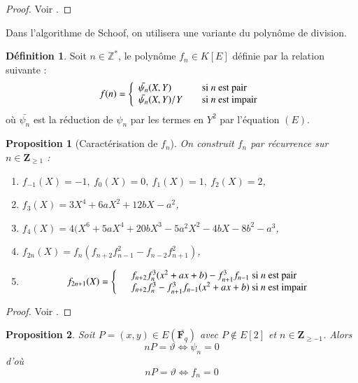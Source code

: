 \documentclass{article}%
\theoremstyle{plain}
\theoremstyle{definition}
\newtheorem{definition}{Définition}[section]
\theoremstyle{plain}
\newtheorem{proposition}{Proposition}[section]
\theoremstyle{plain}
\theoremstyle{remark}
\newcommand\fq{\mathbf{F}_{q}}
\begin{document}
\begin{proof}
Voir \cite{ref4}.
\end{proof}

Dans l'algorithme de Schoof, on utilisera une variante du polynôme de division.

\begin{definition}
Soit $n\in\mathbb{Z}^{*}$, le polynôme $f_{n}\in K[E]$ définie par la relation suivante : 
$$
f(n) = \left\{
\begin{array}{l l}
  \bar{\psi_{n}}(X,Y) & \quad \text{si } n \text{ est pair}\\
  \bar{\psi_{n}}(X,Y)/Y & \quad \text{si } n \text{ est impair}\\ \end{array} \right.
$$
où $\bar{\psi_{n}}$ est la réduction de $\psi_{n}$ par les termes en $Y^{2}$ par l'équation $(E)$.
\end{definition}

\begin{proposition}[Caractérisation de $f_{n}$]
On construit $f_{n}$ par récurrence sur $n\in\mathbf{Z}_{\geq 1}$ :
\begin{enumerate}
\item $f_{-1}(X)=-1,\ f_{0}(X)=0,\ f_{1}(X)=1,\ f_{2}(X)=2$,
\item $f_{3}(X)=3X^{4} + 6aX^{2} + 12bX - a^{2}$,
\item $f_{4}(X)=4(X^{6} + 5aX^{4} + 20bX^{3} - 5a^{2}X^{2} - 4bX - 8b^{2} - a^{3}$,
\item $f_{2n}(X)=f_{n}(f_{n+2}f_{n-1}^{2} - f_{n-2}f_{n+1}^{2})$,
\item $$
f_{2n+1}(X) = \left\{ 
\begin{array}{cl cl}
 &f_{n+2}f_{n}^{3}(x^{2} + ax + b) - f_{n+1}^{3}f_{n-1} \text{ si  } n \text{ est pair}\\
  &f_{n+2}f_{n}^{3} - f_{n+1}^{3}f_{n-1}(x^{2} + ax + b)\text{ si } n \text{ est impair}\\ \end{array} \right.
$$
\end{enumerate}
\end{proposition}

\begin{proof}
Voir \cite{ref4}.
\end{proof}

\begin{proposition}
Soit $P=(x,y)\in E(\bar{\fq})$ avec $P\notin E[2]$ et $n\in\mathbf{Z}_{\geq -1}$. Alors 
\begin{equation}
nP = \vartheta \Longleftrightarrow \psi_{n} = 0
\label{np}
\end{equation}
d'où
\begin{equation}
nP = \vartheta \Longleftrightarrow f_{n} = 0
\label{np1}
\end{equation}
\end{proposition}
\end{document}
